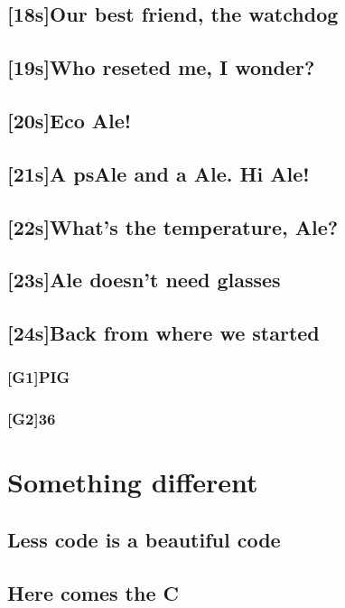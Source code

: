 \documentclass[12pt, a4paper]{book}
\begin{document}
\section{[18s]Our best friend, the watchdog}
\section{[19s]Who reseted me, I wonder?}
\section{[20s]Eco Ale!}
\section{[21s]A psAle and a Ale. Hi Ale!}
\section{[22s]What's the temperature, Ale?}
\section{[23s]Ale doesn't need glasses}
\section{[24s]Back from where we started}
\subsection{[G1]PIG}
\subsection{[G2]36}
\chapter{Something different}
\section{Less code is a beautiful code}
\section{Here comes the C}
\end{document}
